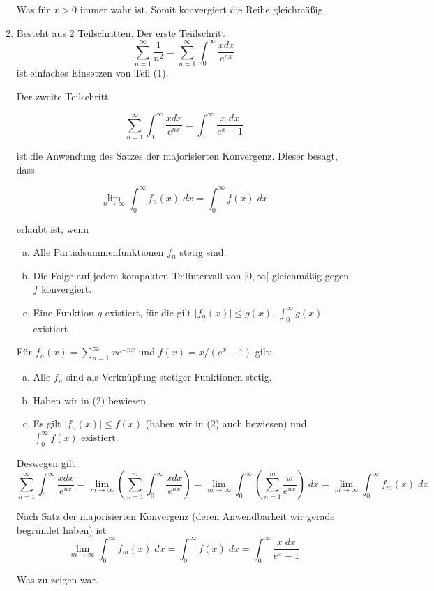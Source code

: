 \documentclass[a4paper,german,12pt,smallheadings]{scrartcl}
\begin{document}
\begin{enumerate}[(1)]
  Was für $x > 0$ immer wahr ist. Somit konvergiert die Reihe gleichmäßig.

  \item 
  Besteht aus 2 Teilschritten.
  Der erste Teiilschritt 
  \begin{equation*}
    \sum_{n=1}^{\infty}\frac{1}{n^2}=\sum_{n=1}^{\infty}\int_{0}^{\infty}\frac{xdx}{e^{nx}}
  \end{equation*}
  ist einfaches Einsetzen von Teil (1).

  Der zweite Teilschritt

  \begin{equation*}
    \sum_{n=1}^{\infty}\int_{0}^{\infty}\frac{xdx}{e^{nx}} = \int_0^\infty \frac{x \; dx}{e^x-1}
  \end{equation*}

  ist die Anwendung des Satzes der majorisierten Konvergenz. Dieser besagt, dass

  \begin{equation*}
    \lim_{n \to \infty} \int_0^\infty f_n(x) \; dx = \int_0^\infty f(x) \; dx
  \end{equation*}

  erlaubt ist, wenn
  \begin{enumerate}[a)]
    \item Alle Partialsummenfunktionen $f_n$ stetig sind.
    \item Die Folge auf jedem kompakten Teilintervall von $[0,\infty[$ gleichmäßig gegen $f$ konvergiert.
    \item Eine Funktion $g$ existiert, für die gilt $|f_n(x)| \le g(x)$, $\int_0^\infty g(x)$ existiert
  \end{enumerate}

  Für $f_n(x) = \sum_{n=1}^\infty xe^{-nx}$ und $f(x) = x/(e^x - 1)$ gilt:
  \begin{enumerate}[a)]
    \item Alle $f_n$ sind als Verknüpfung stetiger Funktionen stetig.
    \item Haben wir in (2) bewiesen
    \item Es gilt $|f_n(x)| \le f(x)$ (haben wir in (2) auch bewiesen) und $\int_0^\infty f(x)$ existiert.
  \end{enumerate}

  Deswegen gilt
  \begin{equation*}
    \sum_{n=1}^{\infty}\int_{0}^{\infty}\frac{xdx}{e^{nx}}
    =\lim\limits_{m \to \infty}\left(\sum_{n=1}^{m}\int_{0}^{\infty}\frac{xdx}{e^{nx}}\right)
    =\lim\limits_{m \to \infty} \int_{0}^{\infty} \left(\sum_{n=1}^{m}\frac{x}{e^{nx}}\right) \; dx
    =\lim\limits_{m \to \infty} \int_{0}^{\infty} f_m(x) \; dx
  \end{equation*}

  Nach Satz der majorisierten Konvergenz (deren Anwendbarkeit wir gerade begründet haben) ist
  \begin{equation*}
    \lim\limits_{m \to \infty} \int_{0}^{\infty} f_m(x) \; dx = \int_0^\infty f(x) \; dx = \int_0^\infty \frac{x \; dx}{e^x-1}
  \end{equation*}

  Was zu zeigen war.
\end{enumerate}
\end{document}
